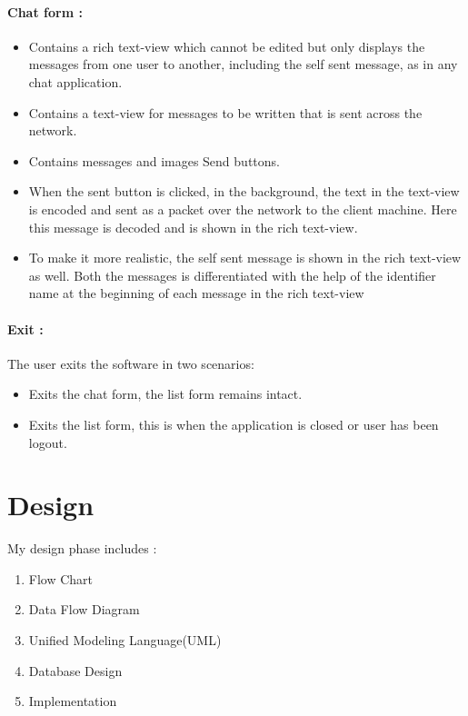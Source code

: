 \paragraph{Chat form :}
\begin{itemize}
	\item Contains a rich text-view which cannot be edited but only displays the messages from one user to another, including the self sent message, as in any chat application.
	\item Contains a text-view for messages to be written that is sent across the network.
	\item Contains messages and images Send buttons.
	\item When the sent button is clicked, in the background, the text in the text-view is encoded
	and sent as a packet over the network to the client machine. Here this message is
	decoded and is shown in the rich text-view.
	\item To make it more realistic, the self sent message is shown in the rich text-view as well. Both
	the messages is differentiated with the help of the identifier name at the beginning of each
	message in the rich text-view
\end{itemize}

\paragraph{Exit :}
The user exits the software in two scenarios:
\begin{itemize}
	\item Exits the chat form, the list form remains intact.
	\item Exits the list form, this is when the application is closed or user has been logout.
\end{itemize}
\section{Design}
My design phase includes :
\begin{enumerate}
	\setlength{\itemsep}{-0.3em}
	\item Flow Chart
	\item Data Flow Diagram
	\item Unified Modeling Language(UML)
	\item Database Design
	\item Implementation
\end{enumerate}
